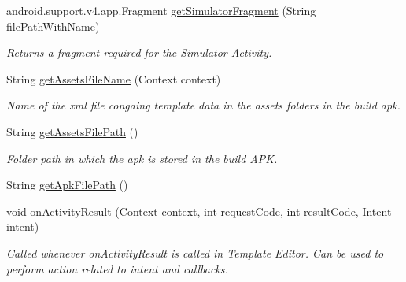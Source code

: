\begin{DoxyCompactItemize}
\item 
android.\+support.\+v4.\+app.\+Fragment \hyperlink{classorg_1_1buildmlearn_1_1toolkit_1_1templates_1_1QuizTemplate_a6477f0a99f11a9938abbb154713b51d3}{get\+Simulator\+Fragment} (String file\+Path\+With\+Name)
\begin{DoxyCompactList}\small\item\em Returns a fragment required for the Simulator Activity. \end{DoxyCompactList}\item 
String \hyperlink{classorg_1_1buildmlearn_1_1toolkit_1_1templates_1_1QuizTemplate_ad53569c2c02377b891f06992f742ce97}{get\+Assets\+File\+Name} (Context context)
\begin{DoxyCompactList}\small\item\em Name of the xml file congaing template data in the assets folders in the build apk. \end{DoxyCompactList}\item 
String \hyperlink{classorg_1_1buildmlearn_1_1toolkit_1_1templates_1_1QuizTemplate_a7f0008da11aa1e2608a82214c92809e3}{get\+Assets\+File\+Path} ()
\begin{DoxyCompactList}\small\item\em Folder path in which the apk is stored in the build A\+PK. \end{DoxyCompactList}\item 
String \hyperlink{classorg_1_1buildmlearn_1_1toolkit_1_1templates_1_1QuizTemplate_afe64be10f6c439dd611e843ceabb5ac4}{get\+Apk\+File\+Path} ()
\item 
void \hyperlink{classorg_1_1buildmlearn_1_1toolkit_1_1templates_1_1QuizTemplate_a23bf444a6527a4be8b416f1d04a4912e}{on\+Activity\+Result} (Context context, int request\+Code, int result\+Code, Intent intent)
\begin{DoxyCompactList}\small\item\em Called whenever on\+Activity\+Result is called in Template Editor. Can be used to perform action related to intent and callbacks. \end{DoxyCompactList}\end{DoxyCompactItemize}
